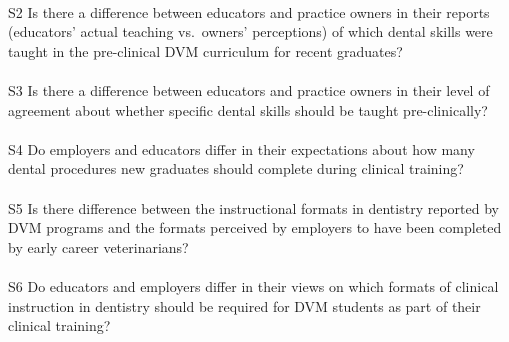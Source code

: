 \documentclass[
  11pt,
  letterpaper,
  DIV=11,
  numbers=noendperiod]{scrartcl}
\makeatletter
\let\oldparagraph\paragraph
\renewcommand{\paragraph}{
    \@ifstar
      \xxxParagraphStar
      \xxxParagraphNoStar
  }
\newcommand{\xxxParagraphStar}[1]{\oldparagraph*{#1}\mbox{}}
\newcommand{\xxxParagraphNoStar}[1]{\oldparagraph{#1}\mbox{}}
\makeatother
\begin{document}
\paragraph{S2 Is there a difference between educators and practice
owners in their reports (educators' actual teaching vs.~owners'
perceptions) of which dental skills were taught in the pre-clinical DVM
curriculum for recent
graduates?}\label{s2-is-there-a-difference-between-educators-and-practice-owners-in-their-reports-educators-actual-teaching-vs.-owners-perceptions-of-which-dental-skills-were-taught-in-the-pre-clinical-dvm-curriculum-for-recent-graduates}

\paragraph{S3 Is there a difference between educators and practice
owners in their level of agreement about whether specific dental skills
should be taught
pre-clinically?}\label{s3-is-there-a-difference-between-educators-and-practice-owners-in-their-level-of-agreement-about-whether-specific-dental-skills-should-be-taught-pre-clinically}

\paragraph{S4 Do employers and educators differ in their expectations
about how many dental procedures new graduates should complete during
clinical
training?}\label{s4-do-employers-and-educators-differ-in-their-expectations-about-how-many-dental-procedures-new-graduates-should-complete-during-clinical-training}

\paragraph{S5 Is there difference between the instructional formats in
dentistry reported by DVM programs and the formats perceived by
employers to have been completed by early career
veterinarians?}\label{s5-is-there-difference-between-the-instructional-formats-in-dentistry-reported-by-dvm-programs-and-the-formats-perceived-by-employers-to-have-been-completed-by-early-career-veterinarians}

\paragraph{S6 Do educators and employers differ in their views on which
formats of clinical instruction in dentistry should be required for DVM
students as part of their clinical
training?}\label{s6-do-educators-and-employers-differ-in-their-views-on-which-formats-of-clinical-instruction-in-dentistry-should-be-required-for-dvm-students-as-part-of-their-clinical-training}
\end{document}
